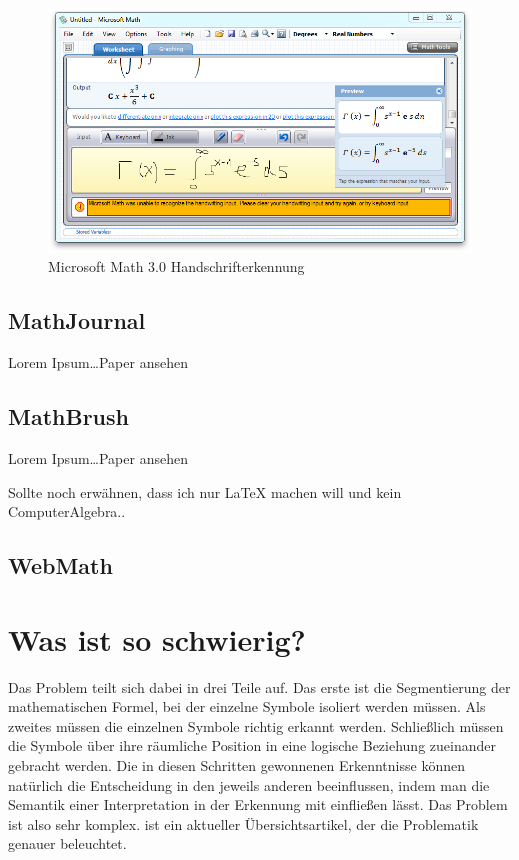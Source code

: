 \begin{figure}
  \begin{center}
    \includegraphics[width=\textwidth]{figures/ms-math-ink.png}
  \end{center}
  \caption{Microsoft Math 3.0 Handschrifterkennung}
  \label{fig:ms-math-ink}
\end{figure}


\subsection{MathJournal}

Lorem Ipsum\dots \TODO Paper ansehen

\subsection{MathBrush}

Lorem Ipsum\dots \TODO Paper ansehen

\TODO Sollte noch erwähnen, dass ich nur LaTeX machen will und kein ComputerAlgebra..

\subsection{WebMath}

\TODO \cite{Vuong:2010p10279}

\section{Was ist so schwierig?}

Das Problem teilt sich dabei in drei Teile auf. Das erste ist die Segmentierung der mathematischen Formel, bei der einzelne Symbole isoliert werden müssen. Als zweites müssen die einzelnen Symbole richtig erkannt werden. Schließlich müssen die Symbole über ihre räumliche Position in eine logische Beziehung zueinander gebracht werden. Die in diesen Schritten gewonnenen Erkenntnisse können natürlich die Entscheidung in den jeweils anderen beeinflussen, indem man die Semantik einer Interpretation in der Erkennung mit einfließen lässt. Das Problem ist also sehr komplex. \cite{Tapia:2007p9160} ist ein aktueller Übersichtsartikel, der die Problematik genauer beleuchtet.

